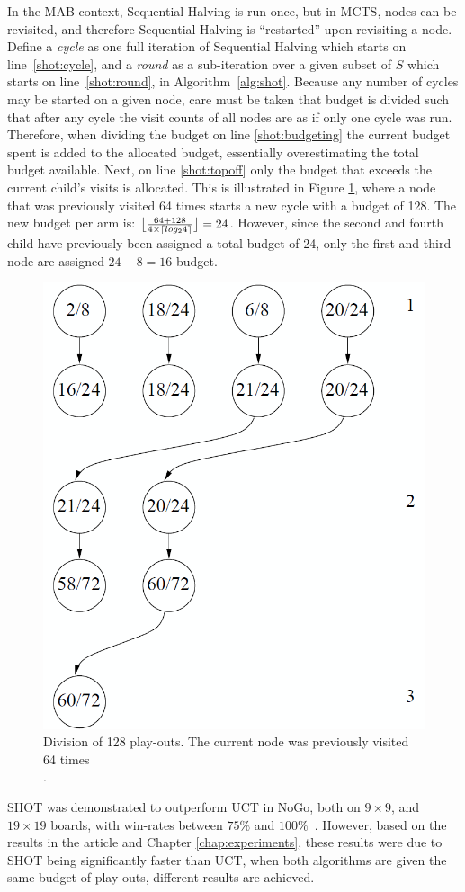 \documentclass{kecsmstr}
\DeclarePairedDelimiter{\ceil}{\lceil}{\rceil}
\DeclarePairedDelimiter{\floor}{\lfloor}{\rfloor}
\begin{document}
In the MAB context, Sequential Halving is run once, but in MCTS, nodes can be revisited, and therefore Sequential Halving is ``restarted'' upon revisiting a node. Define a \emph{cycle} as one full iteration of Sequential Halving which starts on line~\ref{shot:cycle}, and a \emph{round} as a sub-iteration over a given subset of $S$ which starts on line~\ref{shot:round}, in Algorithm~\ref{alg:shot}. Because any number of cycles may be started on a given node, care must be taken that budget is divided such that after any cycle the visit counts of all nodes are as if only one cycle was run. Therefore, when dividing the budget on line \ref{shot:budgeting} the current budget spent is added to the allocated budget, essentially overestimating the total budget available. Next, on line \ref{shot:topoff} only the budget that exceeds the current child's visits is allocated. This is illustrated in Figure \ref{fig:shot-topoffs}, where a node that was previously visited 64 times starts a new cycle with a budget of 128. The new budget per arm is: $\floor[\big]{\frac{64 + 128}{4\times\ceil{log_2{4}}}} = 24$. However, since the second and fourth child have previously been assigned a total budget of 24, only the first and third node are assigned $24-8=16$ budget.

\begin{figure}[h]
	\centering
	\includegraphics[width=.3\textwidth]{img/shot_topoffs.png}
	\caption[SHOT budget division example]{Division of 128 play-outs. The current node was previously visited 64 times \\ \protect{}.}
	\label{fig:shot-topoffs}
\end{figure}

SHOT was demonstrated to outperform UCT in NoGo, both on $9\times9$, and $19\times19$ boards, with win-rates between $75\%$ and $100\%$~. However, based on the results in the article and Chapter \ref{chap:experiments}, these results were due to SHOT being significantly faster than UCT, when both algorithms are given the same budget of play-outs, different results are achieved.
\end{document}
